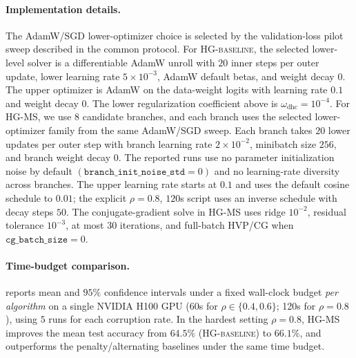 \documentclass{article}
\theoremstyle{normaltheorem}
\begin{document}
\paragraph{Implementation details.}
The AdamW/SGD lower-optimizer choice is selected by the validation-loss pilot sweep described in the common protocol.
For \textsc{HG-baseline}, the selected lower-level solver is a differentiable AdamW unroll with \(20\) inner steps per outer update,
lower learning rate \(5\times10^{-3}\), AdamW default betas, and weight decay \(0\). The upper optimizer is AdamW on the
data-weight logits with learning rate \(0.1\) and weight decay \(0\). The lower regularization coefficient above is
\(\omega_{\mathrm{dhc}}=10^{-4}\).
For \textsc{HG-MS}, we use \(8\) candidate branches, and each branch uses the selected lower-optimizer family from the
same AdamW/SGD sweep. Each branch takes \(20\) lower updates per outer step with branch
learning rate \(2\times10^{-2}\), minibatch size \(256\), and branch weight decay \(0\). The reported runs use no parameter initialization noise by default
\((\texttt{branch\_init\_noise\_std}=0)\) and no learning-rate diversity across branches. The upper learning rate starts at
\(0.1\) and uses the default cosine schedule to \(0.01\); the explicit \(\rho=0.8\), \(120\)s script uses an inverse
schedule with decay steps \(50\). The conjugate-gradient solve in \textsc{HG-MS} uses ridge \(10^{-2}\), residual tolerance
\(10^{-3}\), at most \(30\) iterations, and full-batch HVP/CG when \(\texttt{cg\_batch\_size}=0\).

\paragraph{Time-budget comparison.}
 reports mean and $95\%$ confidence intervals under a fixed wall-clock budget
\emph{per algorithm} on a single NVIDIA H100 GPU (60s for $\rho\in\{0.4,0.6\}$; 120s for $\rho=0.8$),
using $5$ runs for each corruption rate.
In the hardest setting $\rho=0.8$, \textsc{HG-MS} improves the mean test accuracy from $64.5\%$ (\textsc{HG-baseline})
to $66.1\%$, and outperforms the penalty/alternating baselines under the same time budget.
\end{document}
